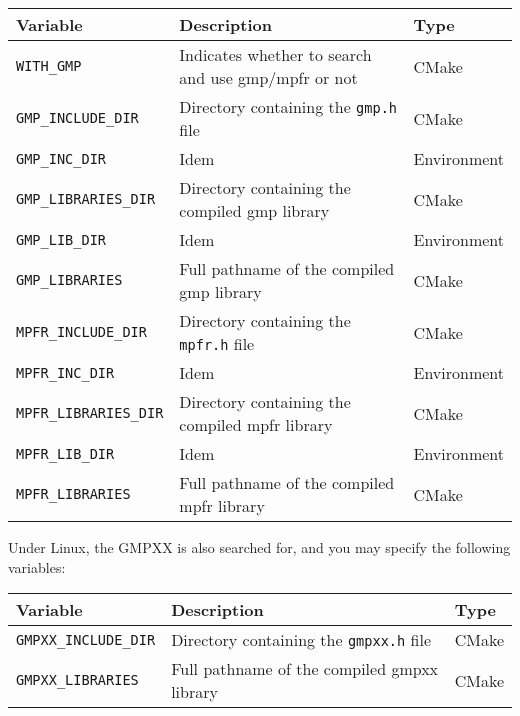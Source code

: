 {\ccTexHtml{\small}{}
\renewcommand{\arraystretch}{1.3}
\gdef\lcTabularBorder{2}
\begin{tabular}{|l|l|l|} \hline
  \textbf{Variable}             & \textbf{Description}                                & \textbf{Type}\\\hline\hline
  \texttt{WITH\_GMP}            & Indicates whether to search and use gmp/mpfr or not & CMake\\\hline
  \texttt{GMP\_INCLUDE\_DIR}    & Directory containing the \texttt{gmp.h} file        & CMake\\\hline
  \texttt{GMP\_INC\_DIR}        & Idem                                                & Environment\\\hline
  \texttt{GMP\_LIBRARIES\_DIR}  & Directory containing the compiled gmp library       & CMake\\\hline
  \texttt{GMP\_LIB\_DIR}        & Idem                                                & Environment\\\hline
  \texttt{GMP\_LIBRARIES}       & Full pathname of the compiled gmp library           & CMake\\\hline
  \texttt{MPFR\_INCLUDE\_DIR}   & Directory containing the \texttt{mpfr.h} file       & CMake\\\hline
  \texttt{MPFR\_INC\_DIR}       & Idem                                                & Environment\\\hline
  \texttt{MPFR\_LIBRARIES\_DIR} & Directory containing the compiled mpfr library      & CMake\\\hline
  \texttt{MPFR\_LIB\_DIR}       & Idem                                                & Environment\\\hline
  \texttt{MPFR\_LIBRARIES}      & Full pathname of the compiled mpfr library          & CMake\\\hline
\end{tabular}
}

Under Linux, the GMPXX is also searched for, and you may specify the following variables:

{\ccTexHtml{\small}{}
\renewcommand{\arraystretch}{1.3}
\gdef\lcTabularBorder{2}
\begin{tabular}{|l|l|l|} \hline
  \textbf{Variable}             & \textbf{Description}                           & \textbf{Type}\\\hline\hline
  \texttt{GMPXX\_INCLUDE\_DIR}  & Directory containing the \texttt{gmpxx.h} file & CMake\\\hline
  \texttt{GMPXX\_LIBRARIES}     & Full pathname of the compiled gmpxx library    & CMake\\\hline
\end{tabular}
}

